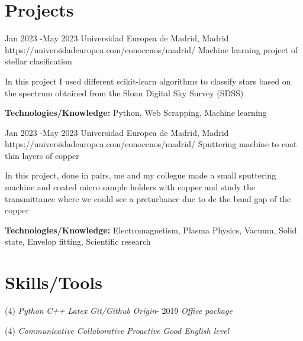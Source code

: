\documentclass[10pt]{article} %
\begin{document}
\section{Projects}

\job
{Jan 2023 -}{May 2023}
{Universidad Europea de Madrid, Madrid}
{https://universidadeuropea.com/conocenos/madrid/}
{Machine learning project of stellar clasification}
{In this project I used different scikit-learn algorithms to classify stars based on the spectrum obtained from the Sloan Digital Sky Survey (SDSS) \\
  \rule{0mm}{5mm}\textbf{Technologies/Knowledge:} Python, Web Scrapping, Machine learning}
\job
{Jan 2023 -}{May 2023}
{Universidad Europea de Madrid, Madrid}
{https://universidadeuropea.com/conocenos/madrid/}
{Sputtering machine to coat thin layers of copper}
{In this project, done in pairs, me and my collegue made a small sputtering machine and coated micro sample holders with copper and study the transmittance where we could see a preturbance due to de the band gap of the copper \\
  \rule{0mm}{5mm}\textbf{Technologies/Knowledge:} Electromagnetism, Plasma Physics, Vacuum, Solid state, Envelop fitting, Scientific research}





\section{Skills/Tools}

{
  \begin{tasks}[counter-format={$\cdot$.}, label-align=left, label-offset={0mm}, label-width={5mm}, item-indent={5mm}, label-format={\bfseries}, column-sep=10mm](4)
    \task \textit{Python}
    \task \textit{C++}
    \task \textit{Latex}
    \task \textit{Git/Github}
    \task \textit{Origin}- 2019
    \task \textit{Office package}
    
    \end{tasks}

}
{
  
  \begin{tasks}[counter-format={$\cdot$.}, label-align=left, label-offset={0mm}, label-width={5mm}, item-indent={5mm}, label-format={\bfseries}, column-sep=10mm](4)
    \task \textit{Communicative}
    \task \textit{Collaborative}
    \task \textit{Proactive}    
    \task \textit{Good English level}    
    
    
    \end{tasks}

}
\end{document}

